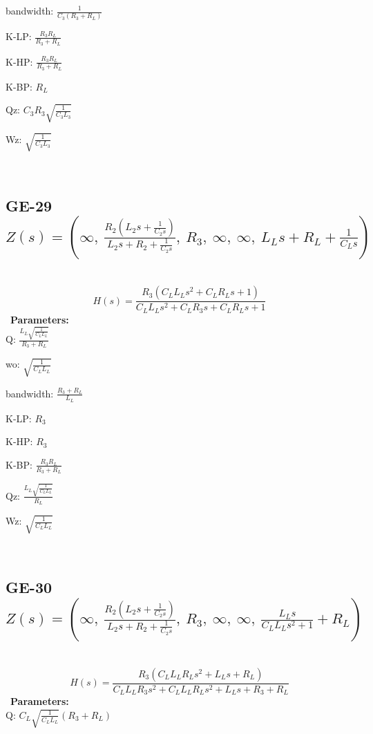 \documentclass{article}
\begin{document}
bandwidth: $\frac{1}{C_{3} \left(R_{3} + R_{L}\right)}$\ 

K-LP: $\frac{R_{3} R_{L}}{R_{3} + R_{L}}$\ 

K-HP: $\frac{R_{3} R_{L}}{R_{3} + R_{L}}$\ 

K-BP: $R_{L}$\ 

Qz: $C_{3} R_{3} \sqrt{\frac{1}{C_{3} L_{3}}}$\ 

Wz: $\sqrt{\frac{1}{C_{3} L_{3}}}$\ 

\ 

\subsection{GE-29 $Z(s) = \left( \infty, \  \frac{R_{2} \left(L_{2} s + \frac{1}{C_{2} s}\right)}{L_{2} s + R_{2} + \frac{1}{C_{2} s}}, \  R_{3}, \  \infty, \  \infty, \  L_{L} s + R_{L} + \frac{1}{C_{L} s}\right)$ } \ 
\textbf{\[H(s) = \frac{R_{3} \left(C_{L} L_{L} s^{2} + C_{L} R_{L} s + 1\right)}{C_{L} L_{L} s^{2} + C_{L} R_{3} s + C_{L} R_{L} s + 1}\] } \ 
\textbf{Parameters:}\\ 

Q: $\frac{L_{L} \sqrt{\frac{1}{C_{L} L_{L}}}}{R_{3} + R_{L}}$\ 

wo: $\sqrt{\frac{1}{C_{L} L_{L}}}$\ 

bandwidth: $\frac{R_{3} + R_{L}}{L_{L}}$\ 

K-LP: $R_{3}$\ 

K-HP: $R_{3}$\ 

K-BP: $\frac{R_{3} R_{L}}{R_{3} + R_{L}}$\ 

Qz: $\frac{L_{L} \sqrt{\frac{1}{C_{L} L_{L}}}}{R_{L}}$\ 

Wz: $\sqrt{\frac{1}{C_{L} L_{L}}}$\ 

\ 

\subsection{GE-30 $Z(s) = \left( \infty, \  \frac{R_{2} \left(L_{2} s + \frac{1}{C_{2} s}\right)}{L_{2} s + R_{2} + \frac{1}{C_{2} s}}, \  R_{3}, \  \infty, \  \infty, \  \frac{L_{L} s}{C_{L} L_{L} s^{2} + 1} + R_{L}\right)$ } \ 
\textbf{\[H(s) = \frac{R_{3} \left(C_{L} L_{L} R_{L} s^{2} + L_{L} s + R_{L}\right)}{C_{L} L_{L} R_{3} s^{2} + C_{L} L_{L} R_{L} s^{2} + L_{L} s + R_{3} + R_{L}}\] } \ 
\textbf{Parameters:}\\ 

Q: $C_{L} \sqrt{\frac{1}{C_{L} L_{L}}} \left(R_{3} + R_{L}\right)$\ 
\end{document}

